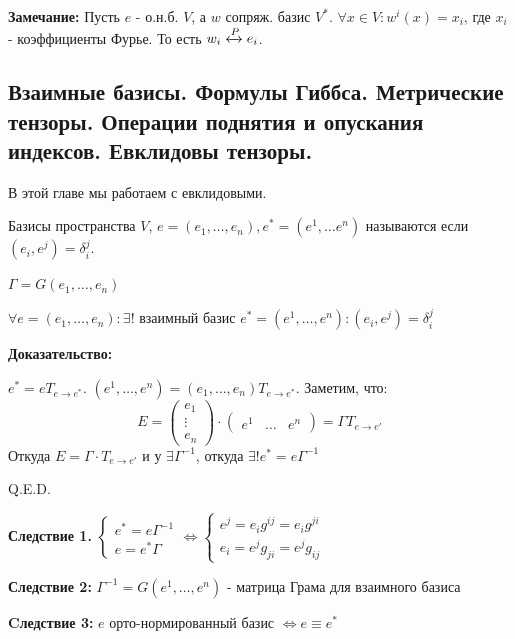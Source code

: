 \textbf{Замечание:} Пусть $e$ - о.н.б. $V$, а $w$ сопряж. базис $V^*$. $\forall x \in V: w^i(x) = x_i$, где $x_i$ - коэффициенты Фурье. То есть $w_i \xleftrightarrow[]{P}e_i$.



\pagebreak
\subsection{Взаимные базисы. Формулы Гиббса. Метрические тензоры. Операции поднятия и опускания индексов. Евклидовы тензоры.}

В этой главе мы работаем с евклидовыми.

 Базисы пространства $V$, $e = (e_1,\ldots,e_n), e^* = (e^1,\ldots e^n)$ называются  если $(e_i,e^j) = \delta_i^j$.

$\Gamma = G(e_1,\ldots ,e_n)$



$\forall e = (e_1,\ldots, e_n): \exists!$ взаимный базис $e^* = (e^1,\ldots, e^n): (e_i,e^j) = \delta_i^j$ 

\textbf{Доказательство:}

$e^* = e T_{e\rightarrow e^*}$. $(e^1,\ldots, e^n) = (e_1,\ldots, e_n)T_{e\rightarrow e^*}$. Заметим, что:
$$E = \begin{pmatrix}
    e_1\\
    \vdots\\
    e_n
\end{pmatrix} \cdot \begin{pmatrix}
    e^1 & \ldots & e^n
\end{pmatrix} = \Gamma T_{e\rightarrow e'}$$
Откуда $E = \Gamma \cdot T_{e\rightarrow e'}$ и у $\exists \Gamma^{-1}$, откуда $\exists! e^* =e \Gamma^{-1}$

\hfill Q.E.D.

\textbf{Следствие 1.}
$\begin{cases}
    e^* = e \Gamma^{-1}\\
    e = e^* \Gamma
\end{cases} \Leftrightarrow \begin{cases}
    e^j =e_i g^{ij}= e_i g^{ji}\\
    e_i = e^j g_{ji} = e^j g_{ij}
\end{cases}$

\textbf{Следствие 2:} $\Gamma^{-1} = G(e^1,\ldots, e^n)$ - матрица Грама для взаимного базиса

\textbf{Cледствие 3:} $e$ орто-нормированный базис $\Leftrightarrow e \equiv e^*$

